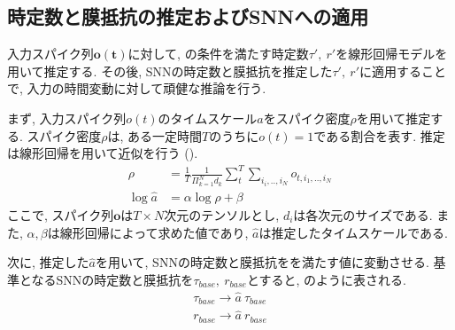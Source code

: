 \makeatletter %
\subsection{時定数と膜抵抗の推定およびSNNへの適用}
入力スパイク列$\bm{o(t)}$に対して, の条件を満たす時定数$\tau',~r'$を線形回帰モデルを用いて推定する.
その後, SNNの時定数と膜抵抗を推定した$\tau',~r'$に適用することで, 入力の時間変動に対して頑健な推論を行う.

まず, 入力スパイク列$o(t)$のタイムスケール$a$をスパイク密度$\rho$を用いて推定する.
スパイク密度$\rho$は, ある一定時間$T$のうちに$o(t)=1$である割合を表す.
推定は線形回帰を用いて近似を行う ().
\begin{equation}
    \begin{split}
        \rho&=\frac{1}{T} \frac{1}{\Pi_{k=1}^{N}d_k} \sum_t^T \sum_{i_i,..,i_N}o_{t,i_1,..,i_N}\\
        \log{\hat{a}}&=\alpha \log{\rho} + \beta
    \end{split}
    \label{sec2:eq:reg}
\end{equation}
ここで, スパイク列$\bm{o}$は$T \times N$次元のテンソルとし, $d_i$は各次元のサイズである.
また, $\alpha, \beta$は線形回帰によって求めた値であり, $\hat{a}$は推定したタイムスケールである.

次に, 推定した$\hat{a}$を用いて, SNNの時定数と膜抵抗をを満たす値に変動させる.
基準となるSNNの時定数と膜抵抗を$\tau_{base},~r_{base}$とすると, のように表される.
\begin{equation}
    \begin{split}
        \tau_{base} \rightarrow \hat{a}~\tau_{base}\\
        r_{base} \rightarrow \hat{a}~r_{base}\\
    \end{split}
    \label{sec2:eq:replace}
\end{equation}